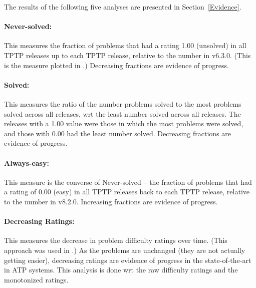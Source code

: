 \documentclass[runningheads]{llncs}
\begin{document}
\noindent
The results of the following five analyses are presented in Section~\ref{Evidence}.

\vspace*{-0.5em}
\paragraph{Never-solved:}
This measures the fraction of problems that had a rating 1.00 (unsolved) in all TPTP releases 
up to each TPTP release, relative to the number in v6.3.0.
(This is the measure plotted in \cite{SSP21}.)
Decreasing fractions are evidence of progress.

\vspace*{-0.5em}
\paragraph{Solved:}
This measures the ratio of the number problems solved to the most problems solved across all 
releases, wrt the least number solved across all releases.
The releases with a 1.00 value were those in which the most problems were solved, and those with
0.00 had the least number solved.
Decreasing fractions are evidence of progress.

\vspace*{-0.5em}
\paragraph{Always-easy:}
This measure is the converse of Never-solved -- the fraction of problems that had a rating of 
0.00 (easy) in all TPTP releases back to each TPTP release, relative to the number in v8.2.0.
Increasing fractions are evidence of progress.

\vspace*{-0.5em}
\paragraph{Decreasing Ratings:}
This measures the decrease in problem difficulty ratings over time. 
(This approach was used in \cite{SFS01}.)
As the problems are unchanged (they are not actually getting easier), decreasing ratings are 
evidence of progress in the state-of-the-art in ATP systems.
This analysis is done wrt the raw difficulty ratings and the monotonized ratings.
\end{document}
